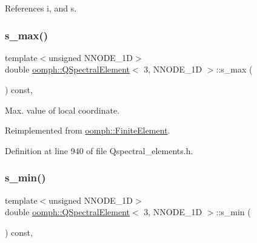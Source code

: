 References i, and s.

\mbox{\label{classoomph_1_1QSpectralElement_3_013_00_01NNODE__1D_01_4_ae6bc16d3ecdebdcdc1564210b8f097c9}} 
\subsubsection{\texorpdfstring{s\+\_\+max()}{s\_max()}}
{\footnotesize\ttfamily template$<$unsigned N\+N\+O\+D\+E\+\_\+1D$>$ \\
double \hyperlink{classoomph_1_1QSpectralElement}{oomph\+::\+Q\+Spectral\+Element}$<$ 3, N\+N\+O\+D\+E\+\_\+1D $>$\+::s\+\_\+max (\begin{DoxyParamCaption}{ }\end{DoxyParamCaption}) const\hspace{0.3cm}{\ttfamily [inline]}, {\ttfamily [virtual]}}



Max. value of local coordinate. 



Reimplemented from \hyperlink{classoomph_1_1FiniteElement_a64adbe9356927133686ab53f00341ea8}{oomph\+::\+Finite\+Element}.



Definition at line 940 of file Qspectral\+\_\+elements.\+h.

\mbox{\label{classoomph_1_1QSpectralElement_3_013_00_01NNODE__1D_01_4_abca011caf80fc3c65a0c2fb1fa85b5ee}} 
\subsubsection{\texorpdfstring{s\+\_\+min()}{s\_min()}}
{\footnotesize\ttfamily template$<$unsigned N\+N\+O\+D\+E\+\_\+1D$>$ \\
double \hyperlink{classoomph_1_1QSpectralElement}{oomph\+::\+Q\+Spectral\+Element}$<$ 3, N\+N\+O\+D\+E\+\_\+1D $>$\+::s\+\_\+min (\begin{DoxyParamCaption}{ }\end{DoxyParamCaption}) const\hspace{0.3cm}{\ttfamily [inline]}, {\ttfamily [virtual]}}



